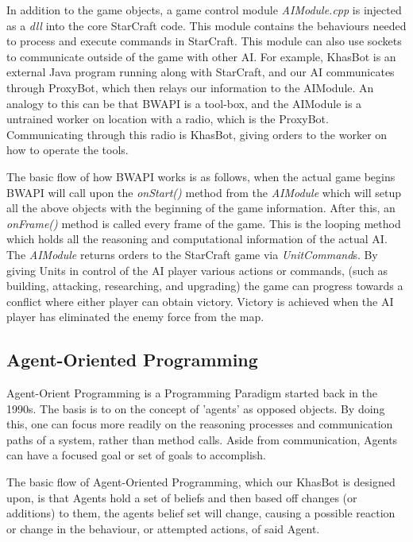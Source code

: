 \documentclass[letterpaper]{article}
\begin{document}
In addition to the game objects, a game control module \emph{AIModule.cpp} is injected as a \emph{dll} into the core StarCraft code.  This module contains the behaviours needed to process and execute commands in StarCraft.  This module can also use sockets to communicate outside of the game with other AI. For example, KhasBot is an external Java program running along with StarCraft, and our AI communicates through ProxyBot, which then relays our information to the AIModule.  An analogy to this can be that BWAPI is a tool-box, and the AIModule is a untrained worker on location with a radio, which is the ProxyBot.  Communicating through this radio is KhasBot, giving orders to the worker on how to operate the tools.

The basic flow of how BWAPI works is as follows, when the actual game begins BWAPI will call upon the \emph{onStart()} method from the \emph{AIModule} which will setup all the above objects with the beginning of the game information.  After this, an \emph{onFrame()} method is called every frame of the game.  This is the looping method which holds all the reasoning and computational information of the actual AI.  The \emph{AIModule} returns orders to the StarCraft game via \emph{UnitCommand}s.  By giving Units in control of the AI player various actions or commands, (such as building, attacking, researching, and upgrading) the game can progress towards a conflict where either player can obtain victory. Victory is achieved when the AI player has eliminated the enemy force from the map.



\subsection{Agent-Oriented Programming}
Agent-Orient Programming is a Programming Paradigm started back in the 1990s.  The basis is to on the concept of 'agents' as opposed objects.  By doing this, one can focus more readily on the reasoning processes and communication paths of a system, rather than method calls\cite{AOP}.  Aside from communication, Agents can have a focused goal or set of goals to accomplish.

The basic flow of Agent-Oriented Programming, which our KhasBot is designed upon, is that Agents hold a set of beliefs and then based off changes (or additions) to them, the agents belief set will change, causing a possible reaction or change in the behaviour, or attempted actions, of said Agent.
\end{document}
